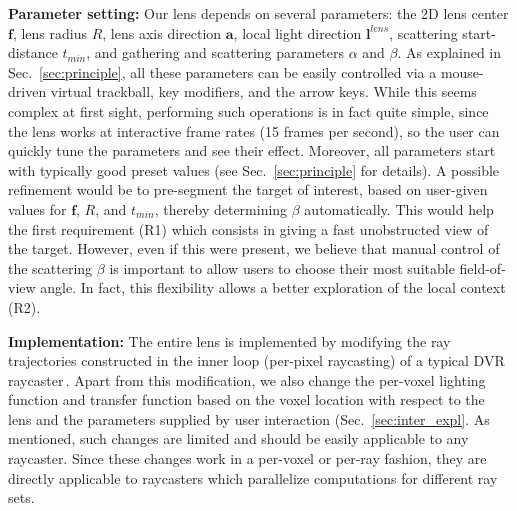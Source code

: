 \vspace{0.15cm}
\noindent\textbf{Parameter setting:} Our lens depends on several parameters: the 2D lens center $\mathbf{f}$, lens radius $R$, lens axis direction $\mathbf{a}$, local light direction $\mathbf{l}^{lens}$, scattering start-distance $t_{min}$, and gathering and scattering parameters $\alpha$ and $\beta$. As explained in Sec.~\ref{sec:principle}, all these parameters can be easily controlled via a mouse-driven virtual trackball, key modifiers, and the arrow keys. While this seems complex at first sight, performing such operations is in fact quite simple, since the lens works at interactive frame rates (15 frames per second), so the user can quickly tune the parameters and see their effect. Moreover, all parameters start with typically good preset values (see Sec.~\ref{sec:principle} for details). A possible refinement would be to pre-segment the target of interest, based on user-given values for $\mathbf{f}$, $R$, and $t_{min}$, thereby determining $\beta$ automatically. This would help the first requirement
 (R1) which consists in giving a fast unobstructed view of the target. However, even if this were present, we believe that manual control of the scattering $\beta$ is important to allow users to choose their most suitable field-of-view angle. In fact, this flexibility allows a better exploration of the local context (R2).

\vspace{0.15cm}
\noindent\textbf{Implementation:} The entire lens is implemented by modifying the ray trajectories constructed in the inner loop (per-pixel raycasting) of a typical DVR raycaster\,\cite{cudasdk}. Apart from this modification, we also change the per-voxel lighting function and transfer function based on the voxel location with respect to the lens and the parameters supplied by user interaction (Sec.~\ref{sec:inter_expl}. As mentioned, such changes are limited and should be easily applicable to any raycaster. Since these changes work in a per-voxel or per-ray fashion, they are directly applicable to raycasters which parallelize computations for different ray sets. 

